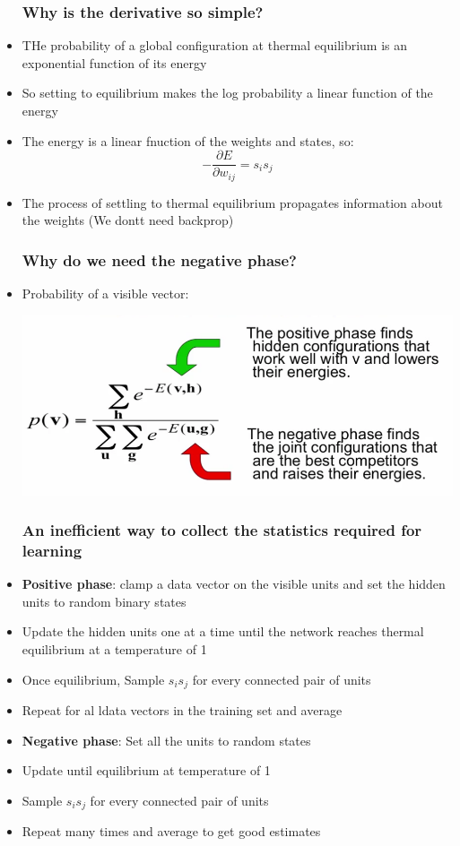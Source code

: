 \begin{itemize}
	\subsubsection{Why is the derivative so simple?}
	\item THe probability of a global configuration at thermal equilibrium is an exponential function of its energy
	\item So setting to equilibrium makes the log probability a linear function of the energy
	\item The energy is a linear fnuction of the weights and states, so:
		$$-\frac{\partial E}{\partial w_{ij}}=s_i s_j$$

	\item The process of settling to thermal equilibrium propagates information about the weights (We dontt need backprop)

	\subsubsection{Why do we need the negative phase?}
	\item Probability of a visible vector:
	\begin{center}
		\includegraphics[scale=0.6]{sections/12/neg.png}
	\end{center}

	\subsubsection{An inefficient way to collect the statistics required for learning}
	\item \textbf{Positive phase}: clamp a data vector on the visible units and set the hidden units to random binary states
	\item Update the hidden units one at a time until the network reaches thermal equilibrium at a temperature of 1
	\item Once equilibrium, Sample $s_i s_j$ for every connected pair of units
	\item Repeat for al ldata vectors in the training set and average
	\item \textbf{Negative phase}: Set all the units to random states
	\item Update until equilibrium at temperature of 1
	\item Sample $s_i s_j$ for every connected pair of units
	\item Repeat many times and average to get good estimates
\end{itemize}